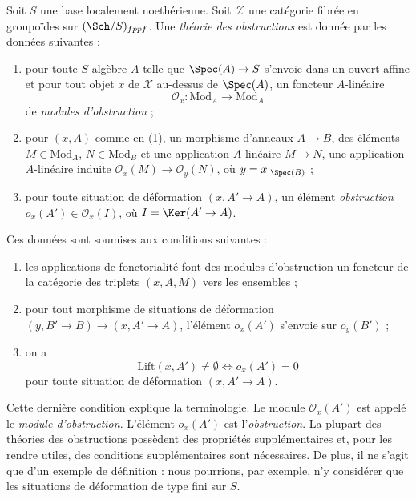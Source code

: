 \begin{definition}
\label{definition-obstruction-theory}
Soit $S$ une base localement noethérienne. Soit $\mathcal{X}$ une catégorie
fibrée en groupoïdes sur $(\Sch/S)_{fppf}$. Une {\it théorie des obstructions}
est donnée par les données suivantes :
\begin{enumerate}
\item pour toute $S$-algèbre $A$ telle que $\Spec(A) \to S$ s'envoie dans
un ouvert affine et pour tout objet $x$ de $\mathcal{X}$ au-dessus de
$\Spec(A)$, un foncteur $A$-linéaire
$$
\mathcal{O}_x : \text{Mod}_A \to \text{Mod}_A
$$
de {\it modules d'obstruction} ;
\item pour $(x, A)$ comme en (1), un morphisme d'anneaux $A \to B$, des
éléments $M \in \text{Mod}_A$, $N \in \text{Mod}_B$ et une application
$A$-linéaire $M \to N$, une application $A$-linéaire induite
$\mathcal{O}_x(M) \to \mathcal{O}_y(N)$, où $y = x|_{\Spec(B)}$ ;
\item pour toute situation de déformation $(x, A' \to A)$, un élément
{\it obstruction} $o_x(A') \in \mathcal{O}_x(I)$, où
$I = \Ker(A' \to A)$.
\end{enumerate}
Ces données sont soumises aux conditions suivantes :
\begin{enumerate}
\item[(i)] les applications de fonctorialité font des modules d'obstruction
un foncteur de la catégorie des triplets $(x, A, M)$ vers les ensembles ;
\item[(ii)] pour tout morphisme de situations de déformation
$(y, B' \to B) \to (x, A' \to A)$, l'élément $o_x(A')$ s'envoie sur
$o_y(B')$ ;
\item[(iii)] on a
$$
\text{Lift}(x, A') \not = \emptyset
\Leftrightarrow
o_x(A') = 0
$$
pour toute situation de déformation $(x, A' \to A)$.
\end{enumerate}
\end{definition}

\noindent
Cette dernière condition explique la terminologie. Le module
$\mathcal{O}_x(A')$ est appelé le {\it module d'obstruction}. L'élément
$o_x(A')$ est l'{\it obstruction}. La plupart des théories des obstructions
possèdent des propriétés supplémentaires et, pour les rendre utiles, des
conditions supplémentaires sont nécessaires. De plus, il ne s'agit que d'un
exemple de définition : nous pourrions, par exemple, n'y considérer que les
situations de déformation de type fini sur $S$.

